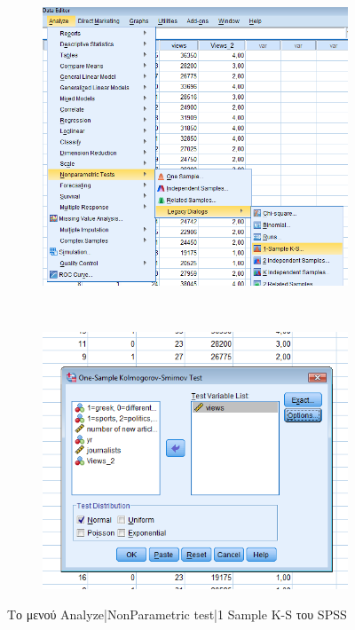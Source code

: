 \documentclass{assignment}
\begin{document}
\begin{Assignment}[Μέρος Β]
\begin{figure}[htbp]
  \centering
  \begin{subfigure}[b]{0.5\textwidth}
     \includegraphics[width=\textwidth,height=0.25\textheight]{images/menu_sample_k_s.png}
  \end{subfigure}%
   ~ %
  \begin{subfigure}[b]{0.5\textwidth}
    \includegraphics[width=\textwidth,height=0.25\textheight]{images/sample_k_s.png}
  \end{subfigure}
  \caption{Το μενού Analyze|NonParametric test|1 Sample K-S του SPSS}
\label{fig:sample_k_s}
\end{figure}



\end{Assignment}
\end{document}
